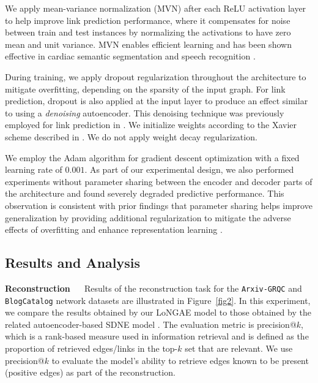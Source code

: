 \documentclass[letterpaper, conference]{IEEEtran}  %
\begin{document}
We apply mean-variance normalization (MVN) after each ReLU activation layer to help improve link prediction performance, where it compensates for noise between train and test instances by normalizing the activations to have zero mean and unit variance. MVN enables efficient learning and has been shown effective in cardiac semantic segmentation \cite{Tran:2016} and speech recognition \cite{Joshi:2016}.

During training, we apply dropout regularization \cite{Srivastava:2014} throughout the architecture to mitigate overfitting, depending on the sparsity of the input graph. For link prediction, dropout is also applied at the input layer to produce an effect similar to using a \emph{denoising} autoencoder. This denoising technique was previously employed for link prediction in \cite{Chen:2014}. We initialize weights according to the Xavier scheme described in \cite{Xavier:2010}. We do not apply weight decay regularization.

We employ the Adam algorithm \cite{Kingma:2015} for gradient descent optimization with a fixed learning rate of $0.001$. As part of our experimental design, we also performed experiments without parameter sharing between the encoder and decoder parts of the architecture and found severely degraded predictive performance. This observation is consistent with prior findings that parameter sharing helps improve generalization by providing additional regularization to mitigate the adverse effects of overfitting and enhance representation learning \cite{Vukotic:2016,Yang:2017}.
%
\subsection{Results and Analysis}
%
\noindent \textbf{Reconstruction} ~~ Results of the reconstruction task for the \texttt{Arxiv-GRQC} and \texttt{BlogCatalog} network datasets are illustrated in Figure~\ref{fig2}. In this experiment, we compare the results obtained by our LoNGAE model to those obtained by the related autoencoder-based SDNE model \cite{Wang:2016}. The evaluation metric is precision@$k$, which is a rank-based measure used in information retrieval and is defined as the proportion of retrieved edges/links in the top-$k$ set that are relevant. We use precision@$k$ to evaluate the model's ability to retrieve edges known to be present (positive edges) as part of the reconstruction.
\end{document}

